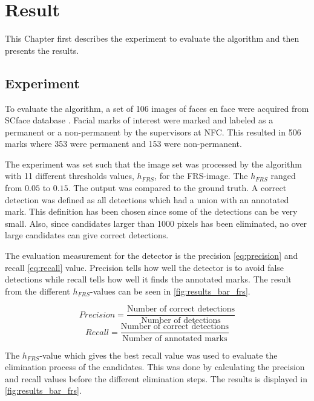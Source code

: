 \chapter{Result}\label{cha:result}

This Chapter first describes the experiment to evaluate the algorithm and then presents the results.

\section{Experiment}
To evaluate the algorithm, a set of 106 images of faces en face were acquired from SCface database \cite{SCface}. Facial marks of interest were marked and labeled as a permanent or a non-permanent by the supervisors at NFC. This resulted in 506 marks where 353 were permanent and 153 were non-permanent.

The experiment was set such that the image set was processed by the algorithm with 11 different thresholds values, $h_{FRS}$, for the FRS-image. The $h_{FRS}$ ranged from $0.05$ to $0.15$. The output was compared to the ground truth. A correct detection was defined as all detections which had a union with an annotated mark. This definition has been chosen since some of the detections can be very small. Also, since candidates larger than 1000 pixels has been eliminated, no over large candidates can give correct detections.   

The evaluation measurement for the detector is the precision \eqref{eq:precision} and recall \eqref{eq:recall} value. Precision tells how well the detector is to avoid false detections while recall tells how well it finds the annotated marks. The result from the different $h_{FRS}$-values can be seen in \cref{fig:results_bar_frs}.

\begin{equation} \label{eq:precision}
Precision = \frac{\text{Number of correct detections}}{\text{Number of detections}}
\end{equation}
\begin{equation} \label{eq:recall}
Recall = \frac{\text{Number of correct detections}}{\text{Number of annotated marks}}
\end{equation}

The $h_{FRS}$-value which gives the best recall value was used to evaluate the elimination process of the candidates. This was done by calculating the precision and recall values before the different elimination steps. The results is displayed in \cref{fig:results_bar_frs}.

